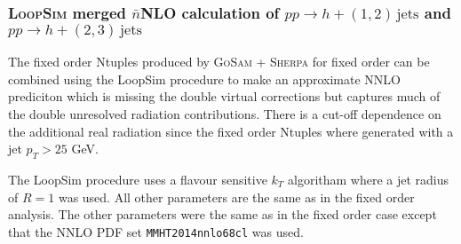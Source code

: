\subsubsection{\textsc{LoopSim} merged $\bar{n}$NLO calculation of $pp\to h+(1,2)\,\text{jets}$ and $pp\to h+(2,3)\,\text{jets}$}
\label{sec:hjetscomp:tools:fo:hnjloopsim}

The fixed order Ntuples produced by \textsc{GoSam} + \textsc{Sherpa} for fixed order can be combined using the LoopSim \cite{Rubin:2010xp}
procedure to make an approximate NNLO prediciton which is missing the double virtual corrections but captures
much of the double unresolved radiation contributions. There is a cut-off dependence on the
additional real radiation since the fixed order Ntuples where generated with a jet $p_T>25$ GeV.

The LoopSim procedure uses a flavour sensitive $k_T$ algoritham where a jet radius of $R=1$ was used.
All other parameters are the same as in the fixed order analysis. The other parameters were the same as in the
fixed order case except that the NNLO PDF set \texttt{MMHT2014nnlo68cl} was used.

